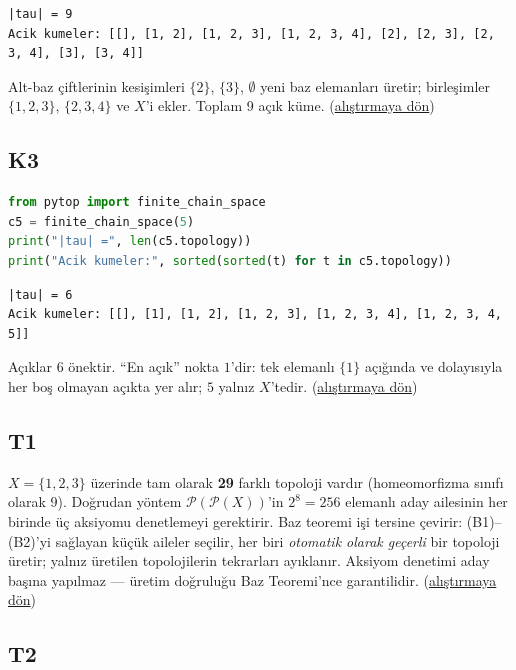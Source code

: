 \begin{lstlisting}[style=output, caption={Çıktı}]
|tau| = 9
Acik kumeler: [[], [1, 2], [1, 2, 3], [1, 2, 3, 4], [2], [2, 3], [2, 3, 4], [3], [3, 4]]
\end{lstlisting}

Alt-baz çiftlerinin kesişimleri $\{2\}$, $\{3\}$, $\emptyset$ yeni baz
elemanları üretir; birleşimler $\{1,2,3\}$, $\{2,3,4\}$ ve $X$'i
ekler. Toplam 9 açık küme.
\hfill(\hyperref[ex:ch04:K2]{alıştırmaya dön})

\subsection*{K3}\label{sol:ch04:K3}

\begin{lstlisting}[language=Python]
from pytop import finite_chain_space
c5 = finite_chain_space(5)
print("|tau| =", len(c5.topology))
print("Acik kumeler:", sorted(sorted(t) for t in c5.topology))
\end{lstlisting}

\begin{lstlisting}[style=output, caption={Çıktı}]
|tau| = 6
Acik kumeler: [[], [1], [1, 2], [1, 2, 3], [1, 2, 3, 4], [1, 2, 3, 4, 5]]
\end{lstlisting}

Açıklar 6 önektir. ``En açık'' nokta $1$'dir: tek elemanlı $\{1\}$
açığında ve dolayısıyla her boş olmayan açıkta yer alır; $5$ yalnız
$X$'tedir.
\hfill(\hyperref[ex:ch04:K3]{alıştırmaya dön})

\subsection*{T1}\label{sol:ch04:T1}

$X=\{1,2,3\}$ üzerinde tam olarak \textbf{29} farklı topoloji vardır
(homeomorfizma sınıfı olarak 9). Doğrudan yöntem
$\mathcal{P}(\mathcal{P}(X))$'in $2^8=256$ elemanlı aday ailesinin her
birinde üç aksiyomu denetlemeyi gerektirir. Baz teoremi işi tersine
çevirir: (B1)--(B2)'yi sağlayan küçük aileler seçilir, her biri
\emph{otomatik olarak geçerli} bir topoloji üretir; yalnız üretilen
topolojilerin tekrarları ayıklanır. Aksiyom denetimi aday başına
yapılmaz --- üretim doğruluğu Baz Teoremi'nce garantilidir.
\hfill(\hyperref[ex:ch04:T1]{alıştırmaya dön})

\subsection*{T2}\label{sol:ch04:T2}

